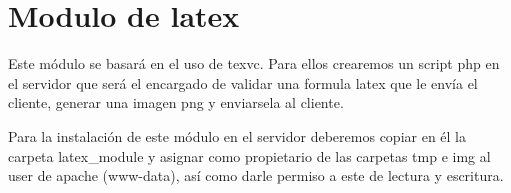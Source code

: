 \chapter{Modulo de latex}

Este módulo se basará en el uso de texvc. Para ellos crearemos un script php en el servidor que será el encargado de validar una formula latex que le envía el cliente, generar una imagen png y enviarsela al cliente.

Para la instalación de este módulo en el servidor deberemos copiar en él la carpeta latex_module y asignar como propietario de las carpetas tmp e img al user de apache (www-data), así como darle permiso a este de lectura y escritura.
